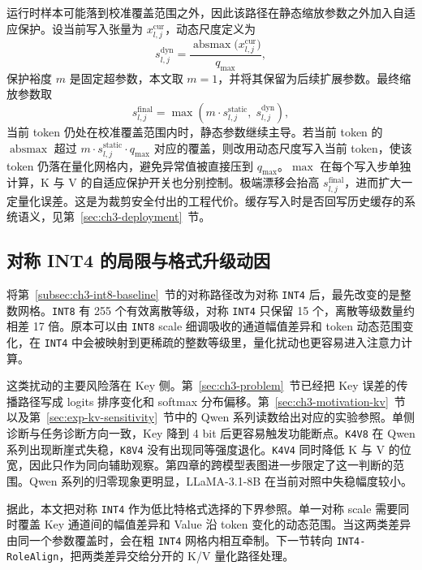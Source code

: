 运行时样本可能落到校准覆盖范围之外，因此该路径在静态缩放参数之外加入自适应保护。设当前写入张量为 $x^{\mathrm{cur}}_{l,j}$，动态尺度定义为
\begin{equation}
s_{l,j}^{\mathrm{dyn}}
=
\frac{\operatorname{absmax}\!\big(x^{\mathrm{cur}}_{l,j}\big)}{q_{\max}},
\end{equation}
保护裕度 $m$ 是固定超参数，本文取 $m=1$，并将其保留为后续扩展参数。最终缩放参数取
\begin{equation}
s_{l,j}^{\mathrm{final}}
=
\max\!\left(
m \cdot s_{l,j}^{\mathrm{static}},
\;
s_{l,j}^{\mathrm{dyn}}
\right),
\end{equation}
当前 token 仍处在校准覆盖范围内时，静态参数继续主导。若当前 token 的 $\operatorname{absmax}$ 超过 $m \cdot s_{l,j}^{\mathrm{static}}\cdot q_{\max}$ 对应的覆盖，则改用动态尺度写入当前 token，使该 token 仍落在量化网格内，避免异常值被直接压到 $q_{\max}$。$\max$ 在每个写入步单独计算，K 与 V 的自适应保护开关也分别控制。极端漂移会抬高 $s_{l,j}^{\mathrm{final}}$，进而扩大一定量化误差。这是为裁剪安全付出的工程代价。缓存写入时是否回写历史缓存的系统语义，见第~\ref{sec:ch3-deployment}~节。

\subsection{对称 INT4 的局限与格式升级动因}

将第~\ref{subsec:ch3-int8-baseline}~节的对称路径改为对称 \texttt{INT4} 后，最先改变的是整数网格。\texttt{INT8} 有 255 个有效离散等级，对称 \texttt{INT4} 只保留 15 个，离散等级数量约相差 17 倍。原本可以由 \texttt{INT8} scale 细调吸收的通道幅值差异和 token 动态范围变化，在 \texttt{INT4} 中会被映射到更稀疏的整数等级里，量化扰动也更容易进入注意力计算。

这类扰动的主要风险落在 Key 侧。第~\ref{sec:ch3-problem}~节已经把 Key 误差的传播路径写成 logits 排序变化和 softmax 分布偏移。第~\ref{sec:ch3-motivation-kv}~节以及第~\ref{sec:exp-kv-sensitivity}~节中的 Qwen 系列读数给出对应的实验参照。单侧诊断与任务诊断方向一致，Key 降到 4 bit 后更容易触发功能断点。\texttt{K4V8} 在 Qwen 系列出现断崖式失稳，\texttt{K8V4} 没有出现同等强度退化。\texttt{K4V4} 同时降低 K 与 V 的位宽，因此只作为同向辅助观察。第四章的跨模型表图进一步限定了这一判断的范围。Qwen 系列的归零现象更明显，LLaMA-3.1-8B 在当前对照中失稳幅度较小。

据此，本文把对称 \texttt{INT4} 作为低比特格式选择的下界参照。单一对称 scale 需要同时覆盖 Key 通道间的幅值差异和 Value 沿 token 变化的动态范围。当这两类差异由同一个参数覆盖时，会在粗 \texttt{INT4} 网格内相互牵制。下一节转向 \texttt{INT4-RoleAlign}，把两类差异交给分开的 K/V 量化路径处理。

